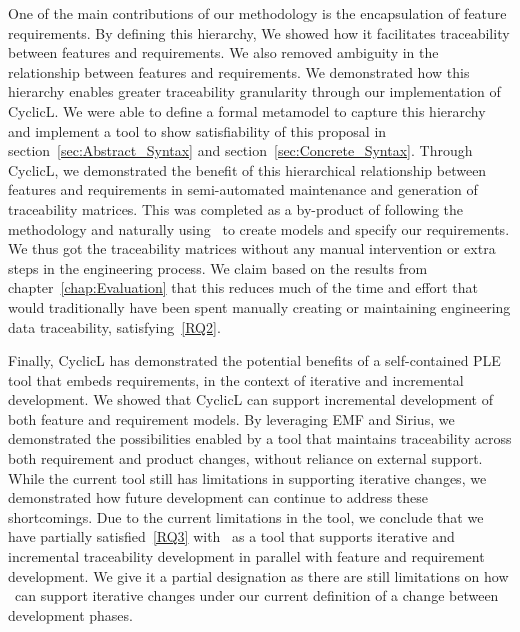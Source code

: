 
One of the main contributions of our methodology is the encapsulation of feature requirements. By defining this hierarchy, We showed how it facilitates traceability between features and requirements. We also removed ambiguity in the relationship between features and requirements. We demonstrated how this hierarchy enables greater traceability granularity through our implementation of CyclicL. We were able to define a formal metamodel to capture this hierarchy and implement a tool to show satisfiability of this proposal in section~\ref{sec:Abstract_Syntax} and section~\ref{sec:Concrete_Syntax}. Through CyclicL, we demonstrated the benefit of this hierarchical relationship between features and requirements in semi-automated maintenance and generation of traceability matrices. This was completed as a by-product of following the methodology and naturally using \tool\ to create models and specify our requirements. We thus got the traceability matrices without any manual intervention or extra steps in the engineering process. We claim based on the results from chapter~\ref{chap:Evaluation} that this reduces much of the time and effort that would traditionally have been spent manually creating or maintaining engineering data traceability, satisfying~\ref{RQ2}.


Finally, CyclicL has demonstrated the potential benefits of a self-contained \gls{PLE} tool that embeds requirements, in the context of iterative and incremental development. We showed that CyclicL can support incremental development of both feature and requirement models. By leveraging \gls{EMF} and Sirius, we demonstrated the possibilities enabled by a tool that maintains traceability across both requirement and product changes, without reliance on external support. While the current tool still has limitations in supporting iterative changes, we demonstrated how future development can continue to address these shortcomings. Due to the current limitations in the tool, we conclude that we have partially satisfied~\ref{RQ3} with \tool\ as a tool that supports iterative and incremental traceability development in parallel with feature and requirement development. We give it a partial designation as there are still limitations on how \tool\ can support iterative changes under our current definition of a change between development phases.

